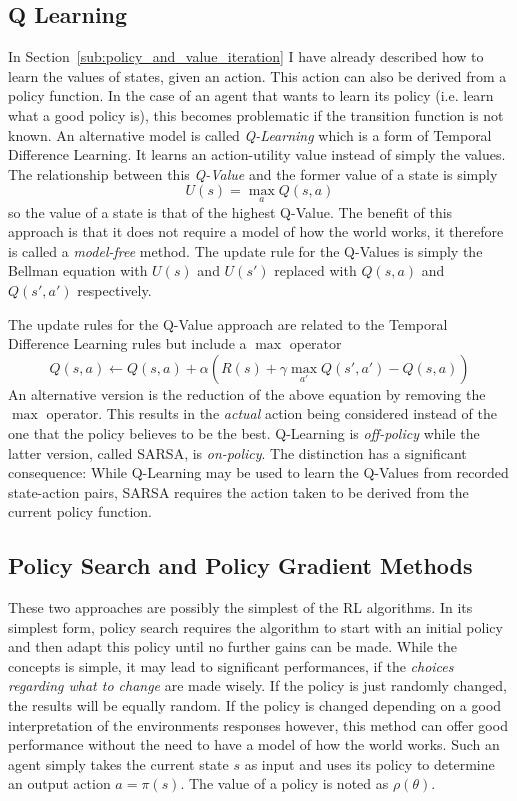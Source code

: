 \subsection{Q Learning}%
\label{sub:q_learning}

In Section~\ref{sub:policy_and_value_iteration} I have already described how to learn the values of states, given an
action. This action can also be derived from a policy function.  In the case of an agent that wants to learn its policy
(i.e. learn what a good policy is), this becomes problematic if the transition function is not known. An alternative
model is called \emph{Q-Learning} which is a form of Temporal Difference Learning. It learns an action-utility value
instead of simply the values. The relationship between this \emph{Q-Value} and the former value of a state is simply 
\begin{equation}
U(s) = \max_{a}Q(s,a)
\end{equation}
so the value of a state is that of the highest Q-Value. The benefit of this approach is that it does not require a model
of how the world works, it therefore is called a \emph{model-free} method. The update rule for the Q-Values is simply
the Bellman equation with $U(s)$ and $U(s')$ replaced with $Q(s,a)$ and $Q(s',a')$ respectively. 

The update rules for the Q-Value approach are related to the Temporal Difference Learning rules but include a $\max$
operator
\begin{equation}
Q(s,a) \gets Q(s,a) + \alpha(R(s) + \gamma \max_{a'}Q(s', a') - Q(s,a))
\end{equation}
An alternative version is the reduction of the above equation by removing the $\max$ operator. This results in the
\emph{actual} action being considered instead of the one that the policy believes to be the best. Q-Learning is
\emph{off-policy} while the latter version, called \ac {SARSA}, is \emph{on-policy}. The distinction has a significant
consequence: While Q-Learning may be used to learn the Q-Values from recorded state-action pairs, \ac {SARSA} requires
the action taken to be derived from the current policy function. 

\subsection{Policy Search and Policy Gradient Methods}%
\label{sub:policy_search_and_policy_gradient_methods}

These two approaches are possibly the simplest of the \ac {RL} algorithms. In its simplest form, policy search requires
the algorithm to start with an initial policy and then adapt this policy until no further gains can be made. While the
concepts is simple, it may lead to significant performances, if the \emph{choices regarding what to change} are made
wisely. If the policy is just randomly changed, the results will be equally random. If the policy is changed depending
on a good interpretation of the environments responses however, this method can offer good performance without the need
to have a model of how the world works. Such an agent simply takes the current state $s$ as input and uses its policy to
determine an output action $a = \pi(s)$. The value of a policy is noted as $\rho(\theta)$.


